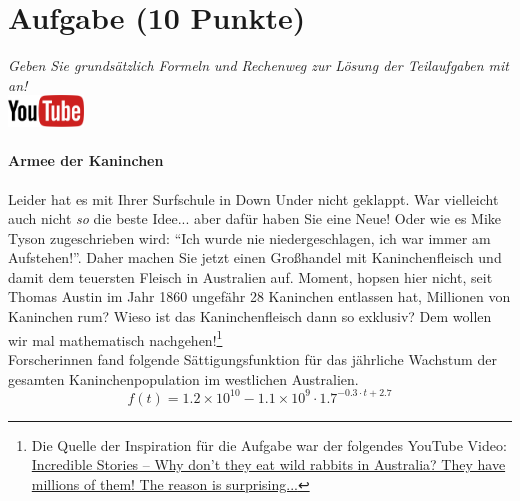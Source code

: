 \documentclass[a4paper, 9pt]{scrartcl}\usepackage[]{graphicx}\usepackage[]{xcolor}
\begin{document}
\clearpage

\section{Aufgabe \hfill (10 Punkte)}

\textit{Geben Sie grunds{\"a}tzlich Formeln und Rechenweg zur L{\"o}sung der
  Teilaufgaben mit an!} \\[1Ex]

\hfill\href{https://youtu.be/Mr6eslls4J0}{\includegraphics[width =
  2cm]{img/youtube}} %
\hspace{2Ex}

\paragraph{Armee der Kaninchen}



Leider hat es mit Ihrer Surfschule in Down Under nicht geklappt. War vielleicht
auch nicht \textit{so} die beste Idee... aber daf{\"u}r haben Sie eine Neue!
Oder wie es Mike Tyson zugeschrieben wird: "`Ich wurde nie
niedergeschlagen, ich war immer am Aufstehen!"'. Daher machen Sie jetzt
einen Gro{\ss}handel mit Kaninchenfleisch und damit dem teuersten Fleisch in
Australien auf. Moment, hopsen hier nicht, seit Thomas Austin im Jahr
1860 ungef{\"a}hr 28 Kaninchen entlassen hat,
Millionen von Kaninchen rum? Wieso ist das Kaninchenfleisch dann so
exklusiv? Dem wollen wir mal mathematisch nachgehen!\footnote{Die Quelle
  der Inspiration f{\"u}r die Aufgabe war der folgendes YouTube Video:
  \href{https://youtu.be/38fuOr3tdgc?si=Li7NL_FoByML8JtT}{ Incredible
    Stories -- Why don't they eat wild rabbits in Australia? They have
    millions of them! The reason is surprising...}}
\\

Forscherinnen fand folgende S{\"a}ttigungsfunktion f{\"u}r das j{\"a}hrliche Wachstum
der gesamten Kaninchenpopulation im westlichen Australien.
\begin{equation*}
  f(t) = \ensuremath{1.2\times 10^{10}} - \ensuremath{1.1\times 10^{9}} \cdot 1.7^{-0.3 \cdot t + 2.7}
\end{equation*}
\end{document}
